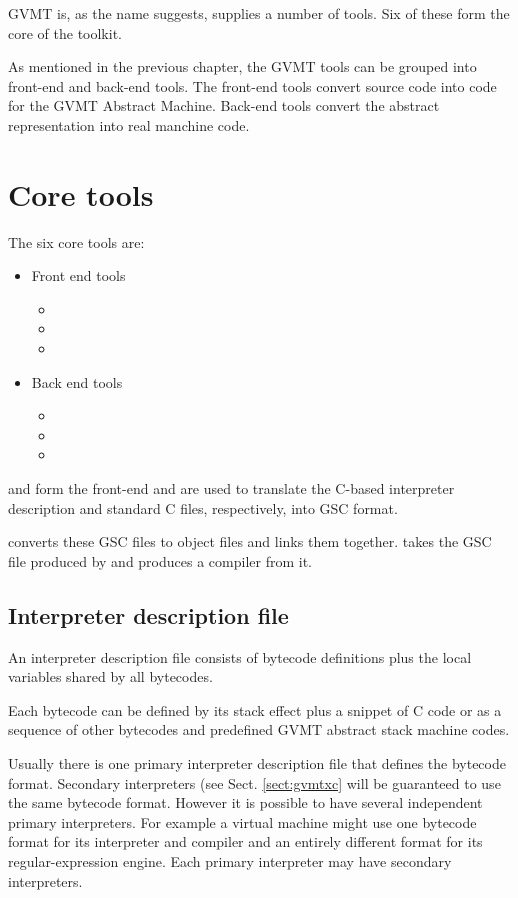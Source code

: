 

GVMT is, as the name suggests, supplies a number of tools. Six of these form the core of the toolkit. 

As mentioned in the previous chapter, the GVMT tools can be grouped into front-end and back-end tools. The front-end tools convert source code into code for the GVMT Abstract Machine. Back-end tools convert the abstract representation into real manchine code.

\section {Core tools}
The six core tools are:
\begin{itemize}
 \item Front end tools
\begin{itemize}
\item \gvmtic
\item \gvmtc
\item \gvmtxc
\end{itemize}
 \item Back end tools
\begin{itemize}
\item \gvmtas
\item \gvmtcc
\item \glink
\end{itemize}
\end{itemize}

\gvmtic{} and \gvmtc{} form the front-end and are used to translate the C-based interpreter description and standard C files, respectively, into GSC format.

\gvmtas{} converts these GSC files to object files and \glink{} links them together.
\gvmtcc{} takes the GSC file produced by \gvmtic{} and produces a compiler from it.

\subsection{Interpreter description file}
An interpreter description file consists of bytecode definitions plus the local variables shared by all bytecodes.

Each bytecode can be defined by its stack effect plus a snippet of C code or as a sequence of other bytecodes and predefined GVMT abstract stack machine codes.

Usually there is one primary interpreter description file that defines the bytecode format. Secondary interpreters (see Sect. \ref{sect:gvmtxc} will be guaranteed to use the same bytecode format. However it is possible to have several independent primary interpreters. For example a virtual machine might use one bytecode format for its interpreter and compiler and an entirely different format for its regular-expression engine. Each primary interpreter may have secondary interpreters.

